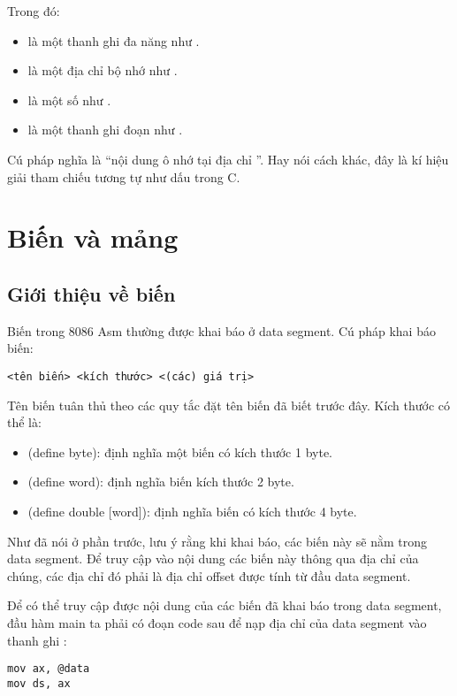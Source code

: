 \documentclass[main.tex]{subfiles}
\begin{document}
Trong đó:
\begin{itemize}
    \item {} là một thanh ghi đa năng như .
    \item {} là một địa chỉ bộ nhớ như \cd{[0DEADh], [0BEEFh], [0CAFEh]}.
    \item {} là một số như .
    \item {} là một thanh ghi đoạn như .
\end{itemize}

Cú pháp \cd{[memory]} nghĩa là ``nội dung ô nhớ tại địa chỉ ''. Hay nói cách khác, đây là kí hiệu giải tham chiếu tương tự như dấu \cd{*} trong C.

\section{Biến và mảng}
\subsection{Giới thiệu về biến}
Biến trong 8086 Asm thường được khai báo ở data segment.
Cú pháp khai báo biến:
\begin{verbatim}
<tên biến> <kích thước> <(các) giá trị>
\end{verbatim}

Tên biến tuân thủ theo các quy tắc đặt tên biến đã biết trước đây.
Kích thước có thể là:
\begin{itemize}
    \item {} (define byte): định nghĩa một biến có kích thước 1 byte.
    \item {} (define word): định nghĩa biến kích thước 2 byte.
    \item {} (define double [word]): định nghĩa biến có kích thước 4 byte.
\end{itemize}

Như đã nói ở phần trước, lưu ý rằng khi khai báo, các biến này sẽ nằm trong data segment. Để truy cập vào nội dung các biến này thông qua địa chỉ của chúng, các địa chỉ đó phải là địa chỉ offset được tính từ đầu data segment.

Để có thể truy cập được nội dung của các biến đã khai báo trong data segment, đầu hàm main ta phải có đoạn code sau để nạp địa chỉ của data segment vào thanh ghi :
\begin{verbatim}
mov ax, @data 
mov ds, ax
\end{verbatim}
\end{document}
